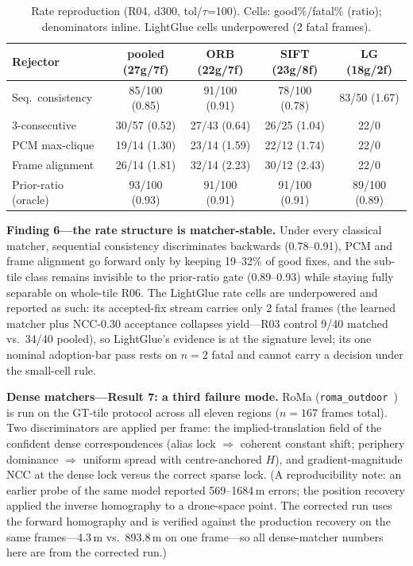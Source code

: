 \documentclass[journal]{IEEEtran}
\begin{document}
\begin{table}[t]
\caption{Rate reproduction (R04, d300, tol/$\tau$=100). Cells: good\%/fatal\% (ratio); denominators inline. LightGlue cells underpowered (2 fatal frames).}
\label{tab:matcherrate}
\centering
\footnotesize
\setlength{\tabcolsep}{1.6pt}
\begin{tabular}{@{}lcccc@{}}
\toprule
Rejector & \shortstack{pooled\\(27g/7f)} & \shortstack{ORB\\(22g/7f)} & \shortstack{SIFT\\(23g/8f)} & \shortstack{LG\\(18g/2f)} \\
\midrule
Seq.\ consistency & 85/100 (0.85) & 91/100 (0.91) & 78/100 (0.78) & 83/50 (1.67) \\
3-consecutive & 30/57 (0.52) & 27/43 (0.64) & 26/25 (1.04) & 22/0 \\
PCM max-clique & 19/14 (1.30) & 23/14 (1.59) & 22/12 (1.74) & 22/0 \\
Frame alignment & 26/14 (1.81) & 32/14 (2.23) & 30/12 (2.43) & 22/0 \\
Prior-ratio (oracle) & 93/100 (0.93) & 91/100 (0.91) & 91/100 (0.91) & 89/100 (0.89) \\
\bottomrule
\end{tabular}
\end{table}

\textbf{Finding 6---the rate structure is matcher-stable.} Under every classical matcher, sequential consistency discriminates backwards (0.78--0.91), PCM and frame alignment go forward only by keeping 19--32\% of good fixes, and the sub-tile class remains invisible to the prior-ratio gate (0.89--0.93) while staying fully separable on whole-tile R06. The LightGlue rate cells are underpowered and reported as such: its accepted-fix stream carries only 2 fatal frames (the learned matcher plus NCC-0.30 acceptance collapses yield---R03 control 9/40 matched vs.\ 34/40 pooled), so LightGlue's evidence is at the signature level; its one nominal adoption-bar pass rests on $n=2$ fatal and cannot carry a decision under the small-cell rule.

\textbf{Dense matchers---Result 7: a third failure mode.} RoMa (\texttt{roma\_outdoor}~\cite{roma}) is run on the GT-tile protocol across all eleven regions ($n=167$ frames total). Two discriminators are applied per frame: the implied-translation field of the confident dense correspondences (alias lock $\Rightarrow$ coherent constant shift; periphery dominance $\Rightarrow$ uniform spread with centre-anchored $H$), and gradient-magnitude NCC at the dense lock versus the correct sparse lock. (A reproducibility note: an earlier probe of the same model reported 569--1684\,m errors; the position recovery applied the inverse homography to a drone-space point. The corrected run uses the forward homography and is verified against the production recovery on the same frames---4.3\,m vs.\ 893.8\,m on one frame---so all dense-matcher numbers here are from the corrected run.)
\end{document}
